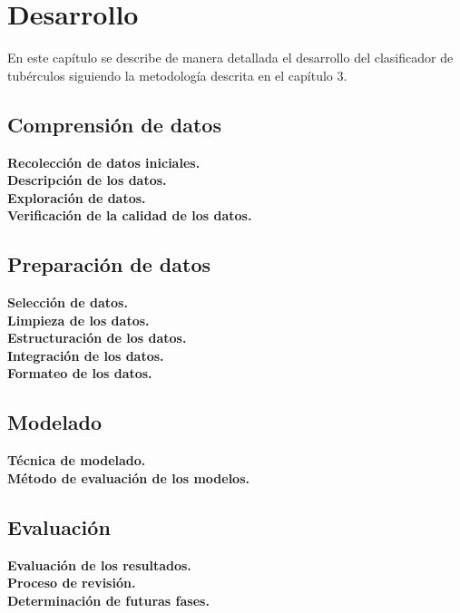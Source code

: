 \chapter{Desarrollo} 

En este capítulo se describe de manera detallada el desarrollo del clasificador de tubérculos siguiendo la metodología descrita en el capítulo 3.
\noindent	
\section{Comprensión de datos}

\noindent
\textbf{Recolección de datos iniciales.}\\
\textbf{Descripción de los datos.}\\
\textbf{Exploración de datos.}\\
\textbf{Verificación de la calidad de los datos.}\\

\section{Preparación de datos}

\noindent
\textbf{Selección de datos.}\\
\textbf{Limpieza de los datos.}\\
\textbf{Estructuración de los datos.}\\
\textbf{Integración de los datos.}\\
\textbf{Formateo de los datos.}\\

\section{Modelado}

\noindent
\textbf{Técnica de modelado.}\\
\textbf{Método de evaluación de los modelos.}\\

\section{Evaluación}

\noindent
\textbf{Evaluación de los resultados.}\\
\textbf{Proceso de revisión.}\\
\textbf{Determinación de futuras fases.}\\